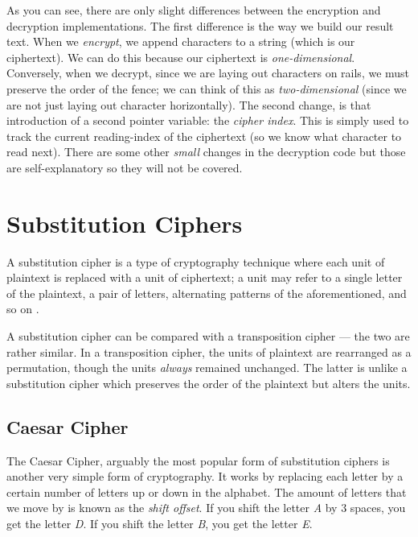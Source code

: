 As you can see, there are only slight differences between the encryption and decryption implementations. The first difference is the
way we build our result text. When we \textit{encrypt}, we append characters to a string (which is our ciphertext). We can do this because
our ciphertext is \textit{one-dimensional}. Conversely, when we decrypt, since we are laying out characters on rails, we must preserve the order of the
fence; we can think of this as \textit{two-dimensional} (since we are not just laying out character horizontally). 
The second change, is that introduction of a second pointer variable: the \textit{cipher index}. 
This is simply used to track the current reading-index of the ciphertext (so we know what character to read next). 
There are some other \textit{small} changes in the decryption code but those are self-explanatory so they will not be covered.

\section{Substitution Ciphers}

A substitution cipher is a type of cryptography technique where each unit of plaintext is replaced with a unit of ciphertext; a unit may refer to a single
letter of the plaintext, a pair of letters, alternating patterns of the aforementioned, and so on \cite{wiki:substitution_cipher}.

A substitution cipher can be compared with a transposition cipher --- the two are rather similar. In a transposition cipher, the units of plaintext are rearranged as a
permutation, though the units \textit{always} remained unchanged. The latter is unlike a substitution cipher which preserves the order of the plaintext but alters
the units.

\subsection{Caesar Cipher}
The Caesar Cipher, arguably the most popular form of substitution ciphers is another very simple form of cryptography. 
It works by replacing each letter by a certain number of letters up or down in the alphabet. The amount of 
letters that we move by is known as the \textit{shift offset}. If you shift the letter \textit{A} by 3 spaces, you get 
the letter \textit{D}. If you shift the letter \textit{B}, you get the letter \textit{E}.

